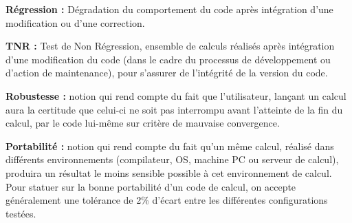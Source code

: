 \textbf{R\'egression :} D\'egradation du comportement du code apr\`es int\'egration d'une modification ou d'une correction.\smallskip\newline

\textbf{TNR :} Test de Non R\'egression, ensemble de calculs r\'ealis\'es apr\`es int\'egration d'une modification du code (dans le cadre du processus de d\'eveloppement ou d'action de maintenance), pour s'assurer de l'int\'egrit\'e de la version du code.\smallskip\newline

\textbf{Robustesse :} notion qui rend compte du fait que l'utilisateur, lan\c cant un calcul aura la certitude que celui-ci ne soit pas interrompu avant l'atteinte de la fin du calcul, par le code lui-m\^eme sur crit\`ere de mauvaise convergence.\smallskip\newline

\textbf{Portabilit\'e :} notion qui rend compte du fait qu'un m\^eme calcul, r\'ealis\'e dans diff\'erents environnements (compilateur, OS, machine PC ou serveur de calcul), produira un r\'esultat le moins sensible possible \`a cet environnement de calcul. Pour statuer sur la bonne portabilit\'e d'un code de calcul, on accepte g\'en\'eralement une tol\'erance de 2\% d'\'ecart entre les diff\'erentes configurations test\'ees.\smallskip\newline


